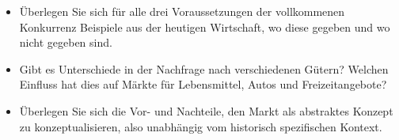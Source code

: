 \documentclass[
  nswissgerman,
  a4paper,
  DIV=11,
  numbers=noendperiod,
  oneside,
  openany]{scrreprt}
\providecommand{\tightlist}{%
  \setlength{\itemsep}{0pt}\setlength{\parskip}{0pt}}
\begin{document}
\begin{tcolorbox}[enhanced jigsaw, arc=.35mm, bottomrule=.15mm, bottomtitle=1mm, breakable, colback=white, colbacktitle=quarto-callout-note-color!10!white, colframe=quarto-callout-note-color-frame, coltitle=black, left=2mm, leftrule=.75mm, opacityback=0, opacitybacktitle=0.6, rightrule=.15mm, title={Vertiefungsfragen}, titlerule=0mm, toprule=.15mm, toptitle=1mm]

\begin{itemize}
\tightlist
\item
  Überlegen Sie sich für alle drei Voraussetzungen der vollkommenen
  Konkurrenz Beispiele aus der heutigen Wirtschaft, wo diese gegeben und
  wo nicht gegeben sind.
\item
  Gibt es Unterschiede in der Nachfrage nach verschiedenen Gütern?
  Welchen Einfluss hat dies auf Märkte für Lebensmittel, Autos und
  Freizeitangebote?
\item
  Überlegen Sie sich die Vor- und Nachteile, den Markt als abstraktes
  Konzept zu konzeptualisieren, also unabhängig vom historisch
  spezifischen Kontext.
\end{itemize}

\end{tcolorbox}
\end{document}
